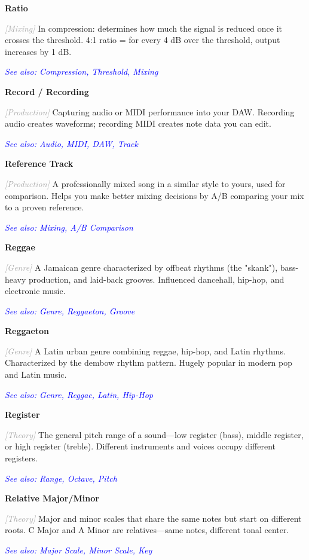 \documentclass[11pt,letterpaper]{article}
\newcommand{\term}[1]{\textbf{\large\color{purple}#1}}
\newcommand{\category}[1]{\textcolor{darkgray}{\textit{\small [#1]}}}
\newcommand{\seealso}[1]{\textcolor{blue}{\textit{See also: #1}}}
\newenvironment{termdef}[1]
  {\noindent\term{#1}\par\nopagebreak}
  {\par\vspace{0.3em}}
\begin{document}
\begin{termdef}{Ratio}
\category{Mixing}
In compression: determines how much the signal is reduced once it crosses the threshold. 4:1 ratio = for every 4 dB over the threshold, output increases by 1 dB.

\seealso{Compression, Threshold, Mixing}
\end{termdef}

\begin{termdef}{Record / Recording}
\category{Production}
Capturing audio or MIDI performance into your DAW. Recording audio creates waveforms; recording MIDI creates note data you can edit.

\seealso{Audio, MIDI, DAW, Track}
\end{termdef}

\begin{termdef}{Reference Track}
\category{Production}
A professionally mixed song in a similar style to yours, used for comparison. Helps you make better mixing decisions by A/B comparing your mix to a proven reference.

\seealso{Mixing, A/B Comparison}
\end{termdef}

\begin{termdef}{Reggae}
\category{Genre}
A Jamaican genre characterized by offbeat rhythms (the "skank"), bass-heavy production, and laid-back grooves. Influenced dancehall, hip-hop, and electronic music.

\seealso{Genre, Reggaeton, Groove}
\end{termdef}

\begin{termdef}{Reggaeton}
\category{Genre}
A Latin urban genre combining reggae, hip-hop, and Latin rhythms. Characterized by the dembow rhythm pattern. Hugely popular in modern pop and Latin music.

\seealso{Genre, Reggae, Latin, Hip-Hop}
\end{termdef}

\begin{termdef}{Register}
\category{Theory}
The general pitch range of a sound—low register (bass), middle register, or high register (treble). Different instruments and voices occupy different registers.

\seealso{Range, Octave, Pitch}
\end{termdef}

\begin{termdef}{Relative Major/Minor}
\category{Theory}
Major and minor scales that share the same notes but start on different roots. C Major and A Minor are relatives—same notes, different tonal center.

\seealso{Major Scale, Minor Scale, Key}
\end{termdef}
\end{document}
